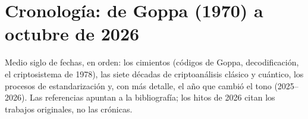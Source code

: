 
\chapter{Cronología: de Goppa (1970) a octubre de 2026}\label{app:cronologia}

\begin{roadmap}
Medio siglo de fechas, en orden: los cimientos (códigos de Goppa,
decodificación, el criptosistema de 1978), las siete décadas de
criptoanálisis clásico y cuántico, los procesos de estandarización y,
con más detalle, el año que cambió el tono (2025--2026). Las
referencias apuntan a la bibliografía; los hitos de 2026 citan los
trabajos originales, no las crónicas.
\end{roadmap}

